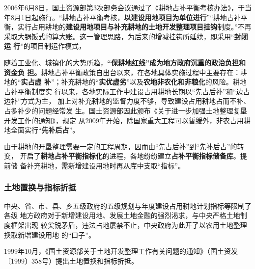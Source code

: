 2006年6月8日，国土资源部第3次部务会议通过了《耕地占补平衡考核办法》，于当
年8月1日起施行。“耕地占补平衡考核，\textbf{以建设用地项目为单位进行}”“耕地占补平
衡，实行占用耕地的\textbf{建设用地项目与补充耕地的土地开发整理项目挂钩}制度。”不再
采取大锅饭式的算大账。这一管理思路，为后来的增减挂钩所延续，即采用“\textbf{封闭运
  行}”的项目制运作模式，

随着工业化、城镇化的大势所趋，\textbf{“保耕地红线”成为地方政府沉重的政治负担和资金负
担。}耕地占补平衡政策自出台以来，在各地具体实施过程中主要存在：耕地的“\textbf{实占虚
补}”；补充耕地的“\textbf{实优虚劣}”以及\textbf{农地非农化和非粮化}的风险。耕地占补平衡制度实
行以来，各地实际工作中建设占用耕地长期以“先占后补”和“边占边补”方式为主，
加上对补充耕地的监督力度不够，导致建设占用耕地占而不补、占多补少的问题经常发
生。国土资源部因此颁布《关于进一步加强土地整理复垦开发工作的通知》，规定
从2009年开始，除国家重大工程可以暂缓外，非农占用耕地全面实行“\textbf{先补后占}”。


由于耕地的开垦整理需要一定的工程周期，因而由“先占后补”到“先补后占”的转变，
开启了\textbf{耕地占补平衡指标化}的进程，各地纷纷建立\textbf{占补平衡指标储备库}。提前储
备补充耕地，需新增建设用地时再从库中支取“指标”。



\subsubsection{土地置换与指标折抵}

中央、省、市、县、乡五级政府的五级规划与年度建设占用耕地计划指标等限制了各级
地方政府对于新增建设用地、发展土地金融的强烈渴求，与中央严格土地制度框架出现
较尖锐矛盾，违法占地屡禁不止，中央政府为此开了以农用土地整理换取新增建设用地
的“口子”。

1999年10月，《国土资源部关于土地开发整理工作有关问题的通知》（国土资发
〔1999〕358号）提出土地置换和指标折抵。

